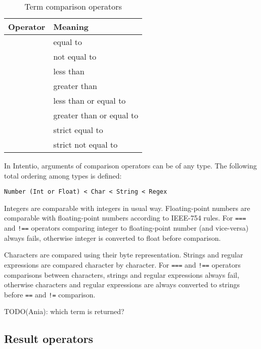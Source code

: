 \begin{bnfutils}
\begin{table}[ht]
  \caption{Term comparison operators}
  \begin{center}
  \begin{tabular}[t]{c|l}
    \bfseries{Operator} & \bfseries{Meaning} \\
    \hline
    \term{==} & equal to \\
    \term{!=} & not equal to \\
    \term{<} & less than \\
    \term{>} & greater than \\
    \term{<=} & less than or equal to \\
    \term{>=} & greater than or equal to \\
    \term{===} & strict equal to \\
    \term{!==} & strict not equal to
  \end{tabular}
  \end{center}
\end{table}
\end{bnfutils}

In Intentio, arguments of comparison operators can be of any type. The following total ordering among types is defined:

\begin{lstlisting}
Number (Int or Float) < Char < String < Regex
\end{lstlisting}

Integers are comparable with integers in usual way. Floating-point numbers are comparable with floating-point numbers according to IEEE-754\cite{IEEE754} rules. For \lstinline{===} and \lstinline{!==} operators comparing integer to floating-point number (and vice-versa) always fails, otherwise integer is converted to float before comparison.

Characters are compared using their byte representation. Strings and regular expressions are compared character by character. For \lstinline{===} and \lstinline{!==} operators comparisons between characters, strings and regular expressions always fail, otherwise characters and regular expressions are always converted to strings before \lstinline{==} and \lstinline{!=} comparison.

TODO(Ania): which term is returned?

\subsection{Result operators}

